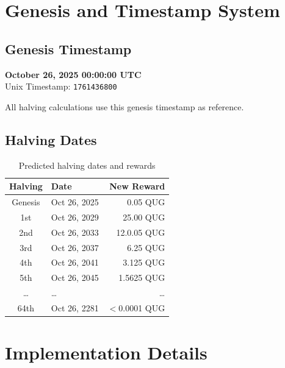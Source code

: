 \documentclass[11pt,a4paper]{article}
\begin{document}
\section{Genesis and Timestamp System}

\subsection{Genesis Timestamp}

\begin{tcolorbox}[colback=lightgray, colframe=primarycolor, title=Network Genesis]
\begin{center}
\textbf{October 26, 2025 00:00:00 UTC} \\
Unix Timestamp: \texttt{1761436800}
\end{center}
\end{tcolorbox}

All halving calculations use this genesis timestamp as reference.

\subsection{Halving Dates}

\begin{table}[h]
\centering
\begin{tabular}{clr}
\toprule
\textbf{Halving} & \textbf{Date} & \textbf{New Reward} \\
\midrule
Genesis & Oct 26, 2025 & 0.05 QUG \\
1st & Oct 26, 2029 & 25.00 QUG \\
2nd & Oct 26, 2033 & 12.0.05 QUG \\
3rd & Oct 26, 2037 & 6.25 QUG \\
4th & Oct 26, 2041 & 3.125 QUG \\
5th & Oct 26, 2045 & 1.5625 QUG \\
\dots & \dots & \dots \\
64th & Oct 26, 2281 & $<$0.0001 QUG \\
\bottomrule
\end{tabular}
\caption{Predicted halving dates and rewards}
\end{table}

\section{Implementation Details}
\end{document}
